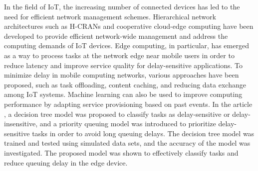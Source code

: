In the field of IoT, the increasing number of connected devices has led to the need for efficient network management schemes. Hierarchical network architectures such as H-CRANs and cooperative cloud-edge computing have been developed to provide efficient network-wide management and address the computing demands of IoT devices. Edge computing, in particular, has emerged as a way to process tasks at the network edge near mobile users in order to reduce latency and improve service quality for delay-sensitive applications. To minimize delay in mobile computing networks, various approaches have been proposed, such as task offloading, content caching, and reducing data exchange among IoT systems. Machine learning can also be used to improve computing performance by adapting service provisioning based on past events. In the article \cite{DelaySensitiveIoT}, a decision tree model was proposed to classify tasks as delay-sensitive or delay-insensitive, and a priority queuing model was introduced to prioritize delay-sensitive tasks in order to avoid long queuing delays. The decision tree model was trained and tested using simulated data sets, and the accuracy of the model was investigated. The proposed model was shown to effectively classify tasks and reduce queuing delay in the edge device.

